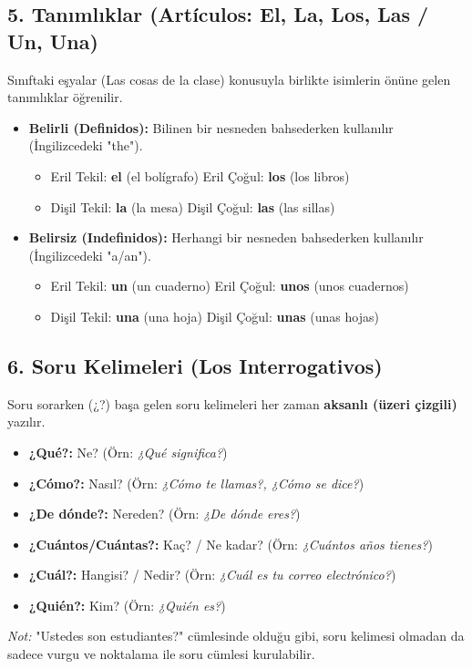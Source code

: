 \documentclass[12pt,a4paper]{article}
\begin{document}
\subsection{5. Tanımlıklar (Artículos: El, La, Los, Las / Un, Una)}
Sınıftaki eşyalar (Las cosas de la clase) konusuyla birlikte isimlerin önüne gelen tanımlıklar öğrenilir.
\begin{itemize}
    \item \textbf{Belirli (Definidos):} Bilinen bir nesneden bahsederken kullanılır (İngilizcedeki "the").
    \begin{itemize}
        \item Eril Tekil: \textbf{el} (el bolígrafo) \textbar{} Eril Çoğul: \textbf{los} (los libros)
        \item Dişil Tekil: \textbf{la} (la mesa) \textbar{} Dişil Çoğul: \textbf{las} (las sillas)
    \end{itemize}
    \item \textbf{Belirsiz (Indefinidos):} Herhangi bir nesneden bahsederken kullanılır (İngilizcedeki "a/an").
    \begin{itemize}
        \item Eril Tekil: \textbf{un} (un cuaderno) \textbar{} Eril Çoğul: \textbf{unos} (unos cuadernos)
        \item Dişil Tekil: \textbf{una} (una hoja) \textbar{} Dişil Çoğul: \textbf{unas} (unas hojas)
    \end{itemize}
\end{itemize}

\subsection{6. Soru Kelimeleri (Los Interrogativos)}
Soru sorarken (¿?) başa gelen soru kelimeleri her zaman \textbf{aksanlı (üzeri çizgili)} yazılır.
\begin{itemize}
    \item \textbf{¿Qué?:} Ne? (Örn: \textit{¿Qué significa?})
    \item \textbf{¿Cómo?:} Nasıl? (Örn: \textit{¿Cómo te llamas?, ¿Cómo se dice?})
    \item \textbf{¿De dónde?:} Nereden? (Örn: \textit{¿De dónde eres?})
    \item \textbf{¿Cuántos/Cuántas?:} Kaç? / Ne kadar? (Örn: \textit{¿Cuántos años tienes?})
    \item \textbf{¿Cuál?:} Hangisi? / Nedir? (Örn: \textit{¿Cuál es tu correo electrónico?})
    \item \textbf{¿Quién?:} Kim? (Örn: \textit{¿Quién es?})
\end{itemize}
\textit{Not:} "Ustedes son estudiantes?" cümlesinde olduğu gibi, soru kelimesi olmadan da sadece vurgu ve noktalama ile soru cümlesi kurulabilir.
\end{document}
